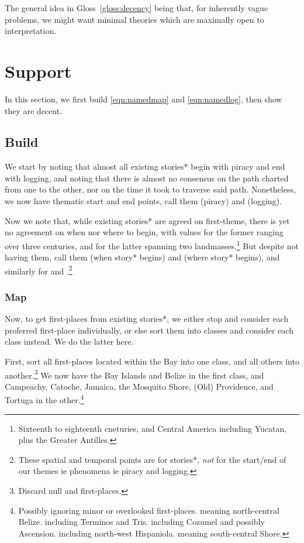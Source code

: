 	The general idea in Gloss~\ref{gloss:decency} being that, for inherently vague problems, we might want minimal theories which are maximally open to interpretation.
%
%
%
\section{Support}
\label{s:support}
	In this section, we first build \ref{eqn:namedmap} and \ref{eqn:namedlog}, then show they are decent.
	\subsection{Build}
	\label{ss:build}
		We start by noting that almost all existing stories* begin with piracy and end with logging, and noting that there is almost no consensus on the path charted from one to the other, nor on the time it took to traverse said path. Nonetheless, we now have thematic start and end points, call them  (piracy) and  (logging).
		
		Now we note that, while existing stories* are agreed on first-theme, there is yet no agreement on when nor where to begin, with values for the former ranging over three centuries, and for the latter spanning two landmasses.\footnote{Sixteenth to eighteenth cneturies, and Central America including Yucatan, plus the Greater Antilles.} But despite not having them, call them  (when story* begins) and  (where story* begins), and similarly for  and .\footnote{These spatial and temporal points are for stories*, \emph{not} for the start/end of our themes ie phenomena ie piracy and logging.}
		\subsubsection{Map}
		\label{sss:map}
			Now, to get first-places from existing stories*, we either stop and consider each proferred first-place individually, or else sort them into classes and consider each class instead. We do the latter here.
		
			First, sort all first-places located within the Bay into one class, and all others into another.\footnote{Discard null and  first-places.} We now have the Bay Islands and Belize in the first class, and Campeachy, Catoche, Jamaica, the Mosquito Shore, (Old) Providence, and Tortuga in the other.\footnote{Possibly ignoring minor or overlooked first-places.  meaning north-central Belize.  including Terminos and Tris.  including Cozumel and possibly Ascension.  including north-west Hispaniola.  meaning south-central Shore.}
		
